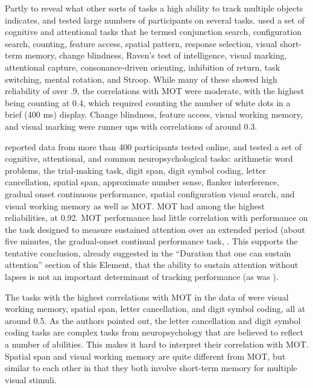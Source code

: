 \documentclass[]{book}
\begin{document}
Partly to reveal what other sorts of tasks a high ability to track multiple objects indicates, \citet{huangMeasuringInterrelationsMultiple2012} and \citet{trevinoBridgingCognitiveNeuropsychological} tested large numbers of participants on several tasks. \citet{huangMeasuringInterrelationsMultiple2012} used a set of cognitive and attentional tasks that he termed conjunction search, configuration search, counting, feature access, spatial pattern, response selection, visual short-term memory, change blindness, Raven's test of intelligence, visual marking, attentional capture, consonance-driven orienting, inhibition of return, task switching, mental rotation, and Stroop. While many of these showed high reliability of over .9, the correlations with MOT were moderate, with the highest being counting at 0.4, which required counting the number of white dots in a brief (400 ms) display. Change blindness, feature access, visual working memory, and visual marking were runner ups with correlations of around 0.3.

\citet{trevinoBridgingCognitiveNeuropsychological} reported data from more than 400 participants tested online, and tested a set of cognitive, attentional, and common neuropsychological tasks: arithmetic word problems, the trial-making task, digit span, digit symbol coding, letter cancellation, spatial span, approximate number sense, flanker interference, gradual onset continuous performance, spatial configuration visual search, and visual working memory as well as MOT. MOT had among the highest reliabilities, at 0.92. MOT performance had little correlation with performance on the task designed to measure sustained attention over an extended period (about five minutes, the gradual-onset continual performance task, \citep{fortenbaughSustainedAttentionLife2015}. This supports the tentative conclusion, already suggested in the ``Duration that one can sustain attention'' section of this Element, that the ability to sustain attention without lapses is not an important determinant of tracking performance (as was ).

The tasks with the highest correlations with MOT in the data of \citet{trevinoBridgingCognitiveNeuropsychological} were visual working memory, spatial span, letter cancellation, and digit symbol coding, all at around 0.5. As the authors pointed out, the letter cancellation and digit symbol coding tasks are complex tasks from neuropsychology that are believed to reflect a number of abilities. This makes it hard to interpret their correlation with MOT. Spatial span and visual working memory are quite different from MOT, but similar to each other in that they both involve short-term memory for multiple visual stimuli.
\end{document}

